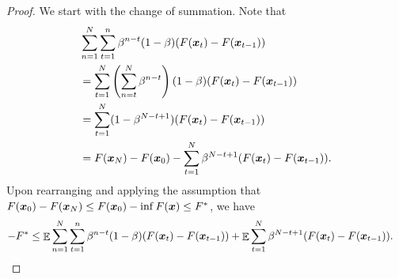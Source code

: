 \begin{proof}
We start with the change of summation. Note that
\begin{align*}
    &\sum_{n=1}^N \sum_{t=1}^n \beta^{n-t}(1-\beta) (F({\boldsymbol{x}}_t) - F({\boldsymbol{x}}_{t-1})) \\
    &= \sum_{t=1}^N \left(\sum_{n=t}^N \beta^{n-t}\right) (1-\beta) (F({\boldsymbol{x}}_t) - F({\boldsymbol{x}}_{t-1})) \\
    &= \sum_{t=1}^N (1-\beta^{N-t+1}) (F({\boldsymbol{x}}_t) - F({\boldsymbol{x}}_{t-1})) \\
    &= F({\boldsymbol{x}}_N) - F({\boldsymbol{x}}_0) - \sum_{t=1}^N \beta^{N-t+1}(F({\boldsymbol{x}}_t)-F({\boldsymbol{x}}_{t-1})).
\end{align*}
Upon rearranging and applying the assumption that $F({\boldsymbol{x}}_0)-F({\boldsymbol{x}}_N) \le F({\boldsymbol{x}}_0)-\inf F({\boldsymbol{x}}) \le F^*$, we have
\begin{align}
    -F^* &\le \mathop{\mathbb{E}}\sum_{n=1}^N\sum_{t=1}^n \beta^{n-t}(1-\beta)(F({\boldsymbol{x}}_t)-F({\boldsymbol{x}}_{t-1})) + \mathop{\mathbb{E}}\sum_{t=1}^N \beta^{N-t+1} (F({\boldsymbol{x}}_t) - F({\boldsymbol{x}}_{t-1})).
    \label{eq:Exp-O2NC:exp-1}
\end{align}


\end{proof}
